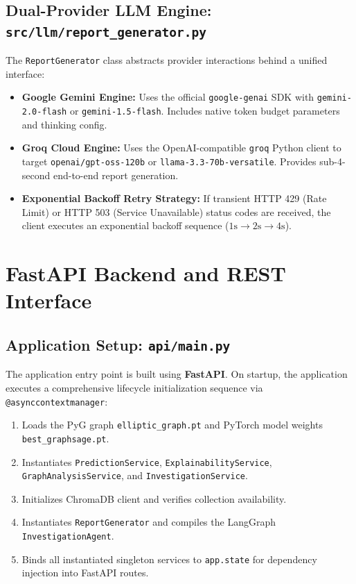 \documentclass[11pt,a4paper]{report}
\begin{document}
\section{Dual-Provider LLM Engine: \texttt{src/llm/report\_generator.py}}
The \texttt{ReportGenerator} class abstracts provider interactions behind a unified interface:
\begin{itemize}[leftmargin=1.5em]
  \item \textbf{Google Gemini Engine:} Uses the official \texttt{google-genai} SDK with \texttt{gemini-2.0-flash} or \texttt{gemini-1.5-flash}. Includes native token budget parameters and thinking config.
  \item \textbf{Groq Cloud Engine:} Uses the OpenAI-compatible \texttt{groq} Python client to target \texttt{openai/gpt-oss-120b} or \texttt{llama-3.3-70b-versatile}. Provides sub-4-second end-to-end report generation.
  \item \textbf{Exponential Backoff Retry Strategy:} If transient HTTP 429 (Rate Limit) or HTTP 503 (Service Unavailable) status codes are received, the client executes an exponential backoff sequence ($1\text{s} \to 2\text{s} \to 4\text{s}$).
\end{itemize}

\chapter{FastAPI Backend and REST Interface}

\section{Application Setup: \texttt{api/main.py}}
The application entry point is built using \textbf{FastAPI}. On startup, the application executes a comprehensive lifecycle initialization sequence via \texttt{@asynccontextmanager}:
\begin{enumerate}[leftmargin=1.5em]
  \item Loads the PyG graph \texttt{elliptic\_graph.pt} and PyTorch model weights \texttt{best\_graphsage.pt}.
  \item Instantiates \texttt{PredictionService}, \texttt{ExplainabilityService}, \texttt{GraphAnalysisService}, and \texttt{InvestigationService}.
  \item Initializes ChromaDB client and verifies collection availability.
  \item Instantiates \texttt{ReportGenerator} and compiles the LangGraph \texttt{InvestigationAgent}.
  \item Binds all instantiated singleton services to \texttt{app.state} for dependency injection into FastAPI routes.
\end{enumerate}
\end{document}
